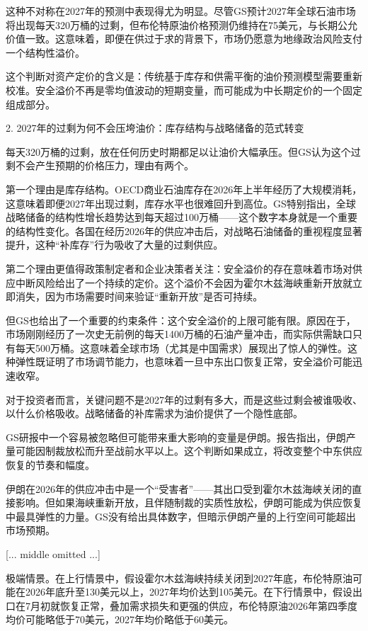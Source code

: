 \documentclass[11pt]{ctexart}
\begin{document}
这种不对称在2027年的预测中表现得尤为明显。尽管GS预计2027年全球石油市场将出现每天320万桶的过剩，但布伦特原油价格预测仍维持在75美元，与长期公允价值一致。这意味着，即便在供过于求的背景下，市场仍愿意为地缘政治风险支付一个结构性溢价。

这个判断对资产定价的含义是：传统基于库存和供需平衡的油价预测模型需要重新校准。安全溢价不再是零均值波动的短期变量，而可能成为中长期定价的一个固定组成部分。

2. 2027年的过剩为何不会压垮油价：库存结构与战略储备的范式转变

每天320万桶的过剩，放在任何历史时期都足以让油价大幅承压。但GS认为这个过剩不会产生预期的价格压力，理由有两个。

第一个理由是库存结构。OECD商业石油库存在2026年上半年经历了大规模消耗，这意味着即便2027年出现过剩，库存水平也很难回升到高位。GS特别指出，全球战略储备的结构性增长趋势达到每天超过100万桶——这个数字本身就是一个重要的结构性变化。各国在经历2026年的供应冲击后，对战略石油储备的重视程度显著提升，这种“补库存”行为吸收了大量的过剩供应。

第二个理由更值得政策制定者和企业决策者关注：安全溢价的存在意味着市场对供应中断风险给出了一个持续的定价。这个溢价不会因为霍尔木兹海峡重新开放就立即消失，因为市场需要时间来验证“重新开放”是否可持续。

但GS也给出了一个重要的约束条件：这个安全溢价的上限可能有限。原因在于，市场刚刚经历了一次史无前例的每天1400万桶的石油产量冲击，而实际供需缺口只有每天500万桶。这意味着全球市场（尤其是中国需求）展现出了惊人的弹性。这种弹性既证明了市场调节能力，也意味着一旦中东出口恢复正常，安全溢价可能迅速收窄。

对于投资者而言，关键问题不是2027年的过剩有多大，而是这些过剩会被谁吸收、以什么价格吸收。战略储备的补库需求为油价提供了一个隐性底部。

GS研报中一个容易被忽略但可能带来重大影响的变量是伊朗。报告指出，伊朗产量可能因制裁放松而升至战前水平以上。这个判断如果成立，将改变整个中东供应恢复的节奏和幅度。

伊朗在2026年的供应冲击中是一个“受害者”——其出口受到霍尔木兹海峡关闭的直接影响。但如果海峡重新开放，且伴随制裁的实质性放松，伊朗可能成为供应恢复中最具弹性的力量。GS没有给出具体数字，但暗示伊朗产量的上行空间可能超出市场预期。

[... middle omitted ...]

极端情景。在上行情景中，假设霍尔木兹海峡持续关闭到2027年底，布伦特原油可能在2026年底升至130美元以上，2027年均价达到105美元。在下行情景中，假设出口在7月初就恢复正常，叠加需求损失和更强的供应，布伦特原油2026年第四季度均价可能略低于70美元，2027年均价略低于60美元。
\end{document}
